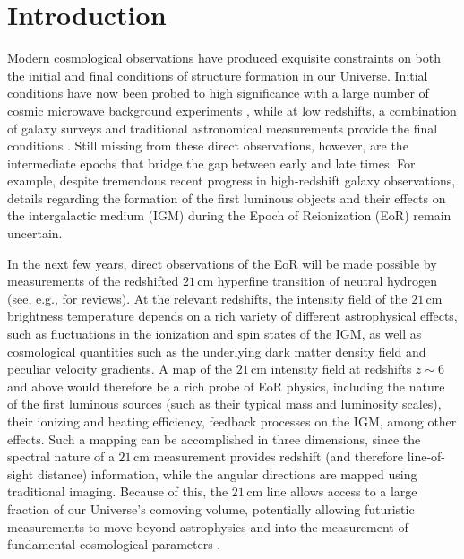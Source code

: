 \documentclass[twocolumn,aps,prd,nofootinbib,showpacs]{revtex4-1}
\begin{document}
\maketitle
\section{Introduction}

Modern cosmological observations have produced exquisite constraints on both the initial and final conditions of structure formation in our Universe.  Initial conditions have now been probed to high significance with a large number of cosmic microwave background experiments \cite{HinshawEtAl2013,Planck}, while at low redshifts, a combination of galaxy surveys and traditional astronomical measurements provide the final conditions \cite{SDSS}.  Still missing from these direct observations, however, are the intermediate epochs that bridge the gap between early and late times.  For example, despite tremendous recent progress in high-redshift galaxy observations, details regarding the formation of the first luminous objects and their effects on the intergalactic medium (IGM) during the Epoch of Reionization (EoR) remain uncertain.

In the next few years, direct observations of the EoR will be made possible by measurements of the redshifted $21\,\textrm{cm}$ hyperfine transition of neutral hydrogen (see, e.g., \cite{Furlanetto2006,Morales2010,Pritchard2012,AviBook} for reviews).  At the relevant redshifts, the intensity field of the $21\,\textrm{cm}$ brightness temperature depends on a rich variety of different astrophysical effects, such as fluctuations in the ionization and spin states of the IGM, as well as cosmological quantities such as the underlying dark matter density field and peculiar velocity gradients.  A map of the $21\,\textrm{cm}$ intensity field at redshifts $z \sim 6$ and above would therefore be a rich probe of EoR physics, including the nature of the first luminous sources (such as their typical mass and luminosity scales), their ionizing and heating efficiency, feedback processes on the IGM, among other effects.  Such a mapping can be accomplished in three dimensions, since the spectral nature of a $21\,\textrm{cm}$ measurement provides redshift (and therefore line-of-sight distance) information, while the angular directions are mapped using traditional imaging.  Because of this, the $21\,\textrm{cm}$ line allows access to a large fraction of our Universe's comoving volume, potentially allowing futuristic measurements to move beyond astrophysics and into the measurement of fundamental cosmological parameters \cite{McQuinn2006,Bowman2007,Mao2008}.
\end{document}
